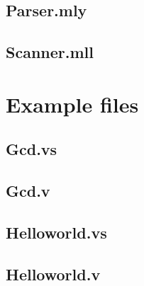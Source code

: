 \documentclass[letterpaper,11pt]{article}
\begin{document}
\subsection{Parser.mly}

\subsection{Scanner.mll}


\section{Example files}
\subsection{Gcd.vs}

\subsection{Gcd.v}

\subsection{Helloworld.vs}

\subsection{Helloworld.v}

\end{document}
